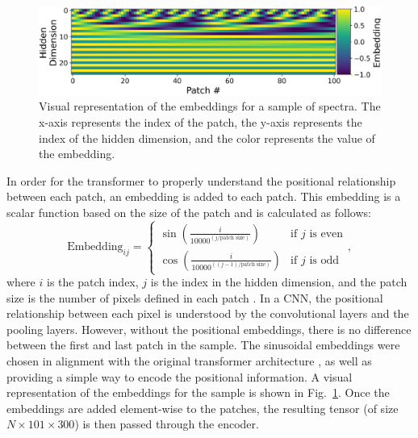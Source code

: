 \begin{figure}[t]
    \centering
    \includegraphics[width=\linewidth]{figures/embeddings_new.png}
    \caption[Positional Embeddings for ViT]{Visual representation of the embeddings for a sample of spectra. The x-axis represents the 
    index of the patch, the y-axis represents the index of the hidden dimension, and the color represents 
the value of the embedding.}
    \label{fig:embedding}
\end{figure}

In order for the transformer to properly understand the positional relationship between each patch, an embedding 
is added to each patch. This embedding is a scalar function based on the size 
of the patch and is calculated as follows: 
\begin{equation}
    \text{Embedding}_{ij} = \begin{cases} \sin\left(\frac{i}{10000^{(j / \text{patch size})}}\right) & \text{if } j \text{ is even} \\
    \cos\left(\frac{i}{10000^{((j - 1) / \text{patch size})}}\right) & \text{if } j \text{ is odd}\end{cases},
\end{equation}
where $i$ is the patch index, $j$ is the index in the hidden dimension, and 
the patch size is the number of pixels defined in each patch \parencite{vaswani2017}. 
In a CNN, the positional relationship between each pixel is understood by the convolutional layers
and the pooling layers. However, without the positional embeddings, there is no difference between 
the first and last patch in the sample. The sinusoidal embeddings were chosen in 
alignment with the original transformer architecture \parencite{vaswani2017}, as well 
as providing a simple way to encode the positional information. A visual 
representation of the embeddings for the sample is shown in Fig.~\ref{fig:embedding}. Once the 
embeddings are added element-wise to the patches, the resulting tensor (of size $N\times101\times300$) is then passed through the encoder. 



